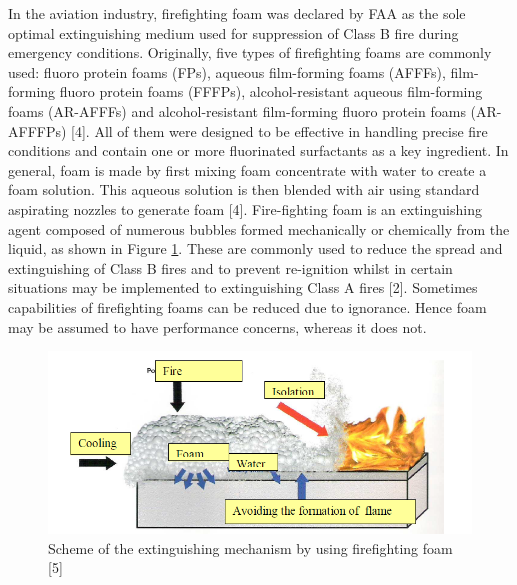 \documentclass[12pt]{report}
\begin{document}
In the aviation industry, firefighting foam was declared by FAA as the sole optimal extinguishing medium used for suppression of Class B fire during emergency conditions. Originally, five types of firefighting foams are commonly used: fluoro protein foams (FPs), aqueous film-forming foams (AFFFs), film-forming fluoro protein foams (FFFPs), alcohol-resistant aqueous film-forming foams (AR-AFFFs) and alcohol-resistant film-forming fluoro protein foams (AR-AFFFPs) [4]. All of them were designed to be effective in handling precise fire conditions and contain one or more fluorinated surfactants as a key ingredient.
In general, foam is made by first mixing foam concentrate with water to create a foam solution. This aqueous solution is then blended with air using standard aspirating nozzles to generate foam [4].  Fire-fighting foam is an extinguishing agent composed of numerous bubbles formed mechanically or chemically from the liquid, as shown in Figure \ref{ch2:figure:scheme}. These are commonly used to reduce the spread and extinguishing of Class B fires and to prevent re-ignition whilst in certain situations may be implemented to extinguishing Class A fires [2]. Sometimes capabilities of firefighting foams can be reduced due to ignorance. Hence foam may be assumed to have performance concerns, whereas it does not. 

\begin{figure}[H]
    \centering
    \includegraphics[width=.8\textwidth]{extinguishing_mechanism_scheme.png}
    \caption{Scheme of the extinguishing mechanism by using firefighting foam [5]}
    \label{ch2:figure:scheme}
\end{figure}
\end{document}
